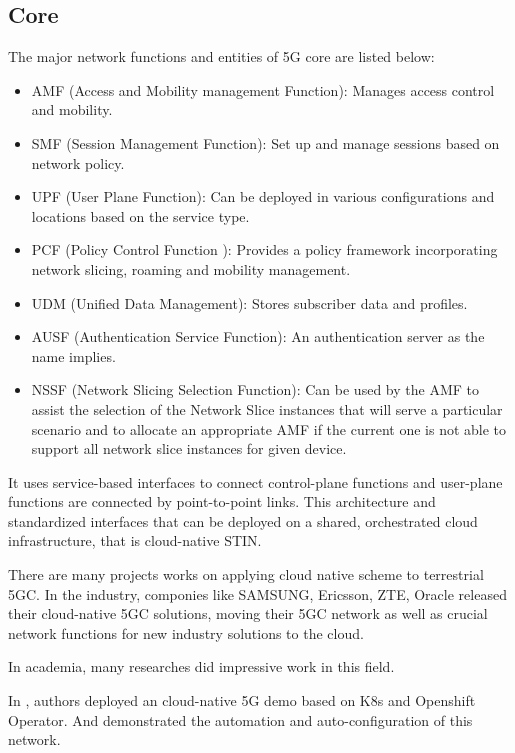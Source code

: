 \documentclass[12pt, draftclsnofoot, onecolumn]{IEEEtran}
\begin{document}
\subsection{Core}

The major network functions and entities  of 5G core are listed below:
\begin{itemize}
	\item AMF (Access and Mobility management Function): Manages access control and mobility.
	\item SMF (Session Management Function): Set up and manage sessions based on network policy.
	\item UPF (User Plane Function): Can be deployed in various configurations and locations based on the service type.
	\item PCF (Policy Control Function ): Provides a policy framework incorporating network slicing, roaming and mobility management.
	\item UDM (Unified Data Management): Stores subscriber data and profiles.
	\item AUSF (Authentication Service Function): An authentication server as the name implies.
	\item NSSF (Network Slicing Selection Function): Can be used by the AMF to assist the selection of the Network Slice instances that will serve a particular scenario and to allocate an appropriate AMF if the current one is not able to support all network slice instances for given device.
\end{itemize}

It uses service-based interfaces to connect control-plane functions and user-plane functions are connected by point-to-point links. This architecture and standardized  interfaces that can be deployed on  a shared, orchestrated cloud infrastructure, that is cloud-native STIN.

There are many projects works on applying cloud native scheme to terrestrial 5GC. 
In the industry, componies like SAMSUNG\cite{samsung}, Ericsson\cite{ericsson}, ZTE\cite{zte}, Oracle\cite{oracle} released their cloud-native 5GC solutions, moving their 5GC network as well as crucial network functions for new industry solutions to the cloud.


In academia, many researches did impressive work in this field. 

In \cite{arouk20205g}, authors deployed an cloud-native 5G demo based on K8s and Openshift Operator. And demonstrated the automation and auto-configuration of this network. 
\end{document}
